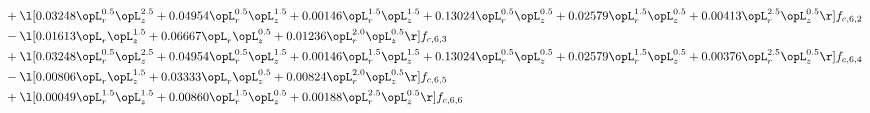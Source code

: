 \begin{alignat}{2}
& + \l[  0.03248 \opL_r^{0.5} \opL_z^{2.5} +  0.04954 \opL_r^{0.5} \opL_z^{1.5} +  0.00146 \opL_r^{1.5} \opL_z^{1.5} +  0.13024 \opL_r^{0.5} \opL_z^{0.5} +  0.02579 \opL_r^{1.5} \opL_z^{0.5} +  0.00413 \opL_r^{2.5} \opL_z^{0.5}  \r] f_{c,6,2} \nonumber \\ 
& - \l[  0.01613 \opL_r \opL_z^{1.5} +  0.06667 \opL_r \opL_z^{0.5} +  0.01236 \opL_r^{2.0} \opL_z^{0.5}  \r] f_{c,6,3} \nonumber \\ 
& + \l[  0.03248 \opL_r^{0.5} \opL_z^{2.5} +  0.04954 \opL_r^{0.5} \opL_z^{1.5} +  0.00146 \opL_r^{1.5} \opL_z^{1.5} +  0.13024 \opL_r^{0.5} \opL_z^{0.5} +  0.02579 \opL_r^{1.5} \opL_z^{0.5} +  0.00376 \opL_r^{2.5} \opL_z^{0.5}  \r] f_{c,6,4} \nonumber \\ 
& - \l[  0.00806 \opL_r \opL_z^{1.5} +  0.03333 \opL_r \opL_z^{0.5} +  0.00824 \opL_r^{2.0} \opL_z^{0.5}  \r] f_{c,6,5} \nonumber \\ 
& + \l[  0.00049 \opL_r^{1.5} \opL_z^{1.5} +  0.00860 \opL_r^{1.5} \opL_z^{0.5} +  0.00188 \opL_r^{2.5} \opL_z^{0.5}  \r] f_{c,6,6} \nonumber \\ 
\end{alignat} 


